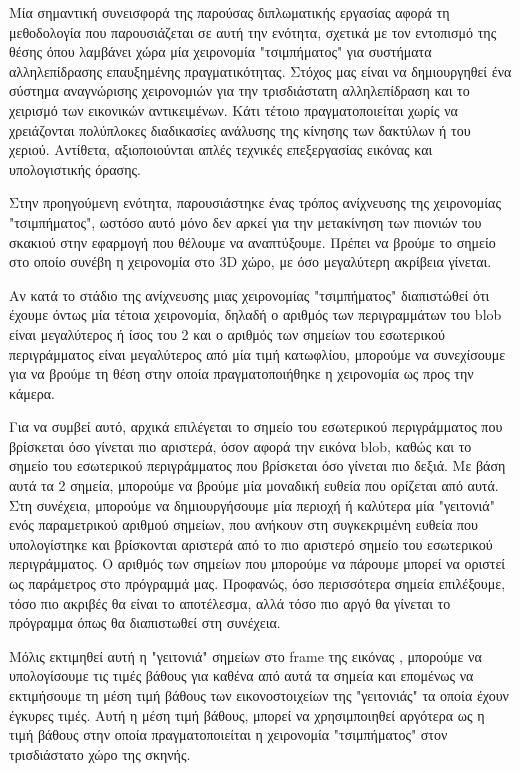 Μία σημαντική συνεισφορά της παρούσας διπλωματικής εργασίας αφορά τη μεθοδολογία που παρουσιάζεται σε αυτή την ενότητα, σχετικά με τον εντοπισμό της θέσης όπου λαμβάνει χώρα μία χειρονομία "τσιμπήματος" για συστήματα αλληλεπίδρασης επαυξημένης πραγματικότητας. Στόχος μας είναι να δημιουργηθεί ένα σύστημα αναγνώρισης χειρονομιών για την τρισδιάστατη αλληλεπίδραση και το χειρισμό των εικονικών αντικειμένων. Κάτι τέτοιο πραγματοποιείται χωρίς να χρειάζονται πολύπλοκες διαδικασίες ανάλυσης της κίνησης των δακτύλων ή του χεριού. Αντίθετα, αξιοποιούνται απλές τεχνικές επεξεργασίας εικόνας και υπολογιστικής όρασης.


Στην προηγούμενη ενότητα, παρουσιάστηκε ένας τρόπος ανίχνευσης της χειρονομίας "τσιμπήματος", ωστόσο αυτό μόνο δεν αρκεί για την μετακίνηση των πιονιών του σκακιού στην εφαρμογή που θέλουμε να αναπτύξουμε. Πρέπει να βρούμε το σημείο στο οποίο συνέβη η χειρονομία στο 3D χώρο, με όσο μεγαλύτερη ακρίβεια γίνεται. 



Αν κατά το στάδιο της ανίχνευσης μιας χειρονομίας "τσιμπήματος" διαπιστώθεί ότι έχουμε όντως μία τέτοια χειρονομία, δηλαδή ο αριθμός των περιγραμμάτων του blob είναι μεγαλύτερος ή ίσος του 2 και ο αριθμός των σημείων του εσωτερικού περιγράμματος είναι μεγαλύτερος από μία τιμή κατωφλίου, μπορούμε να συνεχίσουμε για να βρούμε τη θέση στην οποία πραγματοποιήθηκε η χειρονομία ως προς την κάμερα.

Για να συμβεί αυτό, αρχικά επιλέγεται το σημείο του εσωτερικού περιγράμματος που βρίσκεται όσο γίνεται πιο αριστερά, όσον αφορά την εικόνα blob, καθώς και το σημείο του εσωτερικού περιγράμματος που βρίσκεται όσο γίνεται πιο δεξιά. Με βάση αυτά τα 2 σημεία, μπορούμε να βρούμε μία μοναδική ευθεία που ορίζεται από αυτά. Στη συνέχεια, μπορούμε να δημιουργήσουμε μία περιοχή ή καλύτερα μία "γειτονιά"  ενός παραμετρικού αριθμού σημείων, που ανήκουν στη συγκεκριμένη ευθεία που υπολογίστηκε και βρίσκονται αριστερά από το πιο αριστερό σημείο του εσωτερικού περιγράμματος.  Ο αριθμός των σημείων που μπορούμε να πάρουμε μπορεί να οριστεί ως παράμετρος στο πρόγραμμά μας. Προφανώς, όσο περισσότερα σημεία επιλέξουμε, τόσο πιο ακριβές θα είναι το αποτέλεσμα, αλλά τόσο πιο αργό θα γίνεται το πρόγραμμα όπως θα διαπιστωθεί στη συνέχεια. 


Μόλις εκτιμηθεί αυτή η "γειτονιά" σημείων στο frame της εικόνας , μπορούμε να υπολογίσουμε τις τιμές βάθους για καθένα από αυτά τα σημεία και επομένως να εκτιμήσουμε τη μέση τιμή βάθους των εικονοστοιχείων της "γειτονιάς" τα οποία έχουν έγκυρες τιμές. Αυτή η μέση τιμή βάθους, μπορεί να χρησιμποιηθεί αργότερα ως η τιμή βάθους στην οποία πραγματοποιείται η χειρονομία "τσιμπήματος" στον τρισδιάστατο χώρο της σκηνής. 

